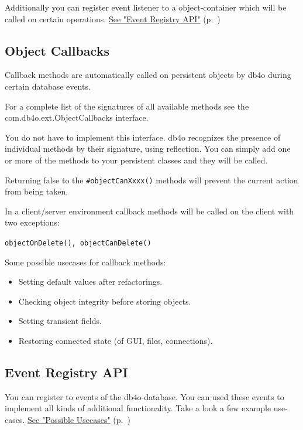Additionally you can register event listener to a object-container which will be called on certain operations. \hyperref[ref:advanced-topics-callbacks-event-registry-api]{See "Event Registry API"} (p.~\pageref{ref:advanced-topics-callbacks-event-registry-api})

\subsection{Object Callbacks}
\label{ref:advanced-topics-callbacks-object-callbacks}

Callback methods are automatically called on persistent objects by db4o during certain database events.

For a complete list of the signatures of all available methods see the com.db4o.ext.ObjectCallbacks interface.

You do not have to implement this interface. db4o recognizes the presence of individual methods by their signature, using reflection. You can simply add one or more of the methods to your persistent classes and they will be called.

Returning false to the \texttt{\#objectCanXxxx()} methods will prevent the current action from being taken.

In a client/server environment callback methods will be called on the client with two exceptions:

\texttt{objectOnDelete(), objectCanDelete()}

Some possible usecases for callback methods:

\begin{itemize}
\item Setting default values after refactorings.
\item Checking object integrity before storing objects.
\item Setting transient fields.
\item Restoring connected state (of GUI, files, connections).
\end{itemize}

\subsection{Event Registry API}
\label{ref:advanced-topics-callbacks-event-registry-api}

You can register to events of the db4o-database. You can used these events to implement all kinds of additional functionality. Take a look a few example use-cases. \hyperref[ref:advanced-topics-callbacks-possible-usecases]{See "Possible Usecases"} (p.~\pageref{ref:advanced-topics-callbacks-possible-usecases})

